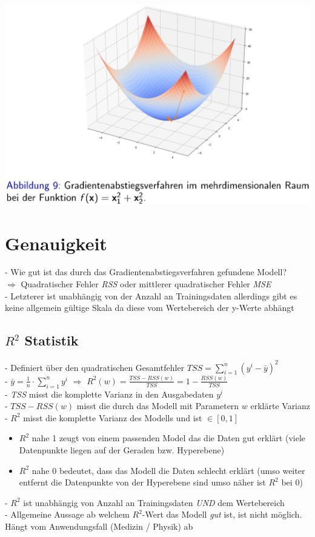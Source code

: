 \documentclass{report}
\begin{document}
\begin{center}
  \includegraphics[scale=.25]{ml02_5}
\end{center}

\section{Genauigkeit}
- Wie gut ist das durch das Gradientenabstiegsverfahren gefundene Modell?\\
$\Rightarrow$ Quadratischer Fehler \textit{RSS} oder mittlerer quadratischer Fehler \textit{MSE}\\
- Letzterer ist unabhängig von der Anzahl an Trainingsdaten allerdings gibt es keine allgemein gültige Skala da diese vom Wertebereich der y-Werte abhängt

\subsection{$R^2$ Statistik}
- Definiert über den quadratischen Gesamtfehler $TSS = \sum_{i=1}^n(y^i - \bar{y})^2$\\
- $\bar{y} = \frac{1}{n}\cdot \sum_{i=1}^ny^i$ $\Rightarrow$ $R^2(w) = \frac{TSS - RSS(w)}{TSS} = 1 - \frac{RSS(w)}{TSS}$\\
- \textit{TSS} misst die komplette Varianz in den Ausgabedaten $y^i$\\
- $TSS - RSS(w)$ misst die durch das Modell mit Parametern $w$ erklärte Varianz\\
- $R^2$ misst die komplette Varianz des Modells und ist $\in [0, 1]$\\
\vspace*{-1.25em}
\begin{itemize}
  \item $R^2$ nahe 1 zeugt von einem passenden Model das die Daten gut erklärt (viele Datenpunkte liegen auf der Geraden bzw. Hyperebene)
  \item $R^2$ nahe 0 bedeutet, dass das Modell die Daten schlecht erklärt (umso weiter entfernt die Datenpunkte von der Hyperebene sind umso näher ist $R^2$ bei 0)
\end{itemize}
- $R^2$ ist unabhängig von Anzahl an Trainingsdaten \textit{UND} dem Wertebereich\\
- Allgemeine Aussage ab welchem $R^2$-Wert das Modell \textit{gut} ist, ist nicht möglich. Hängt vom Anwendungsfall (Medizin / Physik) ab
\end{document}
